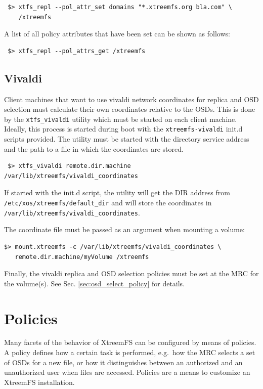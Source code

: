 \documentclass[a4paper,10pt]{book}
\begin{document}
\begin{verbatim}
 $> xtfs_repl --pol_attr_set domains "*.xtreemfs.org bla.com" \
    /xtreemfs
\end{verbatim}

A list of all policy attributes that have been set can be shown as follows:

\begin{verbatim}
 $> xtfs_repl --pol_attrs_get /xtreemfs
\end{verbatim}

\section{Vivaldi}
\label{sec:vivaldi}
Client machines that want to use vivaldi network coordinates for replica and OSD selection must calculate their own coordinates relative to the OSDs. This is done by the \texttt{xtfs\_vivaldi} utility which must be started on each client machine. Ideally, this process is started during boot with the \texttt{xtreemfs-vivaldi} init.d scripts provided. The utility must be started with the directory service address and the path to a file in which the coordinates are stored.

\begin{verbatim}
 $> xtfs_vivaldi remote.dir.machine /var/lib/xtreemfs/vivaldi_coordinates
\end{verbatim}

If started with the init.d script, the utility will get the DIR address from \texttt{/etc/xos/xtreemfs/default\_dir} and will store the coordinates in \texttt{/var/lib/xtreemfs/vivaldi\_coordinates}.

The coordinate file must be passed as an argument when mounting a volume:

\begin{verbatim}
$> mount.xtreemfs -c /var/lib/xtreemfs/vivaldi_coordinates \
   remote.dir.machine/myVolume /xtreemfs
\end{verbatim}

Finally, the vivaldi replica and OSD selection policies must be set at the MRC for the volume(s). See Sec. \ref{sec:osd_select_policy} for details.

\chapter{Policies}
Many facets of the behavior of XtreemFS can be configured by means of policies. A policy defines how a certain task is performed, e.g.\ how the MRC selects a set of OSDs for a new file, or how it distinguishes between an authorized and an unauthorized user when files are accessed. Policies are a means to customize an XtreemFS installation.
\end{document}
